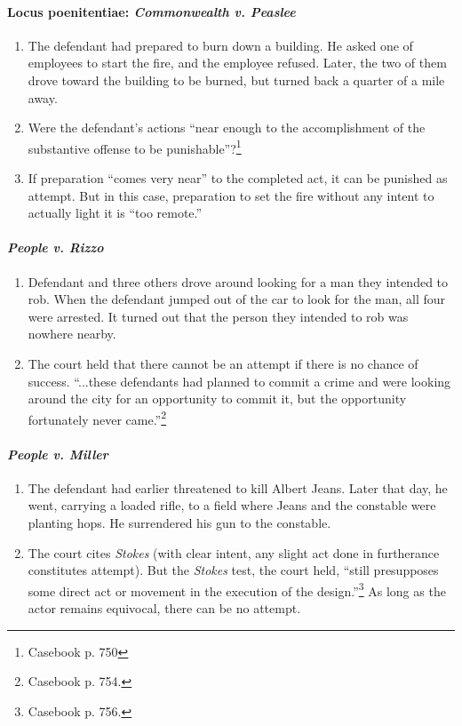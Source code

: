 \paragraph{Locus poenitentiae: \emph{Commonwealth v. Peaslee}}

\begin{enumerate}
    \item The defendant had prepared to burn down a building. He asked one of 
    employees to start the fire, and the employee refused. Later, the two of 
    them drove toward the building to be burned, but turned back a quarter of 
    a mile away.
    \item Were the defendant's actions ``near enough to the accomplishment of 
    the substantive offense to be punishable''?\footnote{Casebook p. 750}
    \item If preparation ``comes very near'' to the completed act, it can be 
    punished as attempt. But in this case, preparation to set the fire without 
    any intent to actually light it is ``too remote.''
\end{enumerate}

\paragraph{\emph{People v. Rizzo}}

\begin{enumerate}
    \item Defendant and three others drove around looking for a man they 
    intended to rob. When the defendant jumped out of the car to look for the 
    man, all four were arrested. It turned out that the person they intended 
    to rob was nowhere nearby.
    \item The court held that there cannot be an attempt if there is no chance 
    of success. ``...these defendants had planned to commit a crime and were 
    looking around the city for an opportunity to commit it, but the 
    opportunity fortunately never came.''\footnote{Casebook p. 754.}
\end{enumerate}

\paragraph{\emph{People v. Miller}}

\begin{enumerate}
    \item The defendant had earlier threatened to kill Albert Jeans. Later 
    that day, he went, carrying a loaded rifle, to a field where Jeans and the 
    constable were planting hops. He surrendered his gun to the constable.
    \item The court cites \emph{Stokes} (with clear intent, any slight act 
    done in furtherance constitutes attempt). But the \emph{Stokes} test, the 
    court held, ``still presupposes some direct act or movement in the 
    execution of the design.''\footnote{Casebook p. 756.} As long as the actor 
    remains equivocal, there can be no attempt.
\end{enumerate}

